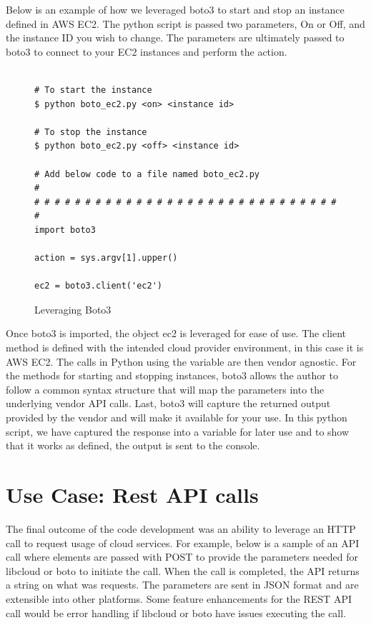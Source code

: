 Below is an example of how we leveraged boto3 to start and stop an instance
defined in AWS EC2. The python script is passed two parameters, On or Off, and
the instance ID you wish to change. The parameters are ultimately passed to
boto3 to connect to your EC2 instances and perform the action.

\begin{figure}[htb]
\begin{verbatim}

# To start the instance
$ python boto_ec2.py <on> <instance id>

# To stop the instance
$ python boto_ec2.py <off> <instance id>

# Add below code to a file named boto_ec2.py
# 
# # # # # # # # # # # # # # # # # # # # # # # # # # # # # # # 
import boto3

action = sys.argv[1].upper()

ec2 = boto3.client('ec2')

\end{verbatim}

\caption{Leveraging Boto3~\cite{hid-sp18-518-Boto3}}\label{c:boto3-example}

\end{figure}

Once boto3 is imported, the object ec2 is leveraged for ease of use. The client
method is defined with the intended cloud provider environment, in this case it
is AWS EC2. The calls in Python using the variable are then vendor agnostic.
For
the methods for starting and stopping instances, boto3 allows the author to
follow a common syntax structure that will map the parameters into the
underlying vendor API calls. Last, boto3 will capture the returned output
provided by the vendor and will make it available for your use. In this python
script, we have captured the response into a variable for later use and to show
that it works as defined, the output is sent to the console.

\section{Use Case: Rest API calls}

The final outcome of the code development was an ability to leverage an HTTP
call to request usage of cloud services. For example, below is a sample of an
API call where elements are passed with POST to provide the parameters needed
for libcloud or boto to initiate the call. When the call is completed, the API
returns a string on what was requests. The parameters are sent in JSON format
and are extensible into other platforms. Some feature enhancements for the REST
API call would be error handling if libcloud or boto have issues executing the
call.  

